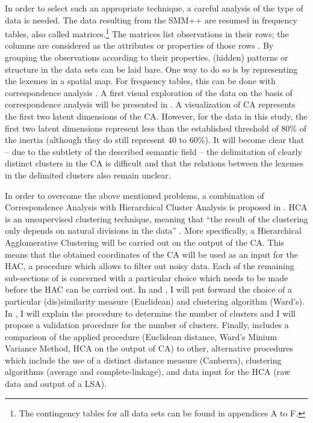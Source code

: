In order to select such an appropriate technique, a careful analysis of the type of data is needed. The data resulting from the SMM++ are resumed in frequency tables, also called matrices.\footnote{The contingency tables for all data sets can be found in appendices A to F.} The matrices list observations in their rows; the columns are considered as the attributes or properties of those rows \citep[118]{baayen_analyzing_2008}. By grouping the observations according to their properties, (hidden) patterns or structure in the data sets can be laid bare. One way to do so is by representing the lexemes in a spatial map. For frequency tables, this can be done with correspondence analysis \citep{greenacre_correspondence_2007}. A first visual exploration of the data on the basis of correspondence analysis will be presented in . A visualization of CA represents the first two latent dimensions of the CA. However, for the data in this study, the first two latent dimensions represent less than the established threshold of 80\% of the inertia (although they do still represent 40 to 60\%). It will become clear that – due to the subtlety of the described semantic field – the delimitation of clearly distinct clusters in the CA is difficult and that the relations between the lexemes in the delimited clusters also remain unclear.

In order to overcome the above mentioned problems, a combination of Correspondence Analysis with Hierarchical Cluster Analysis is proposed in . HCA is an unsupervised clustering technique, meaning that “the result of the clustering only depends on natural divisions in the data” \citep[498]{manning_foundations_1999}. More specifically, a Hierarchical Agglomerative Clustering will be carried out on the output of the CA. This means that the obtained coordinates of the CA will be used as an input for the HAC, a procedure which allows to filter out noisy data. Each of the remaining sub-sections of  is concerned with a particular choice which needs to be made before the HAC can be carried out. In  and , I will put forward the choice of a particular (dis)similarity measure (Euclidean) and clustering algorithm (Ward’s). In , I will explain the procedure to determine the number of clusters and I will propose a validation procedure for the number of clusters. Finally,  includes a comparison of the applied procedure (Euclidean distance, Ward’s Minium Variance Method, HCA on the output of CA) to other, alternative procedures which include the use of a distinct distance measure (Canberra), clustering algorithms (average and complete-linkage), and data input for the HCA (raw data and output of a LSA).

